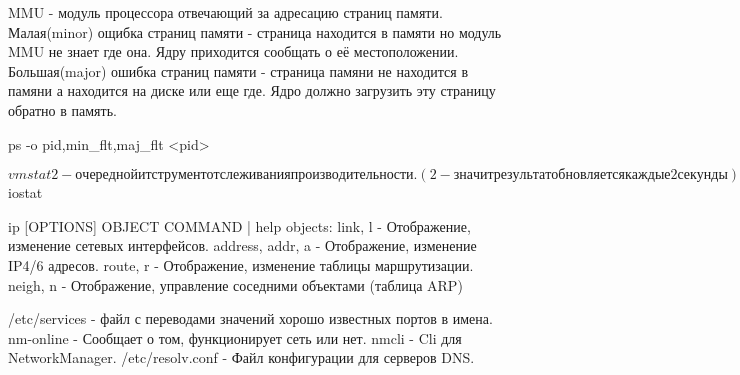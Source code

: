 MMU - модуль процессора отвечающий за адресацию страниц памяти.
    Малая(minor) ощибка страниц памяти - страница находится в памяти но модуль 
MMU не знает где она. Ядру приходится сообщать о её местоположении.
    Большая(major) ошибка страниц памяти - страница памяни не находится в памяни 
а находится на диске или еще где. Ядро должно загрузить эту страницу обратно в
память.

ps -o pid,min_flt,maj_flt <pid> 

$ vmstat 2 - очередной итструмент отслеживания производительности. (2 - значит
результат обновляется каждые 2 секунды).
Поля: %
proc:
 r - run
 b - blocked (запуск не разрешён)
memory:
 swpd - перемещено Kb на диск.
 free - свободно Kb памяти.
 buff - объём памяти для дисковых буферов.
swap:
 si - swap in.(не обязательно свап, может еще читать dll)
 so - swap out.
io:
 bi - blocks in
 bo - blocks out
system:
 in -
 cs -
cpu:
 us - %
 sy - %
 id - %
 wa - %

$ iostat


ip [OPTIONS] OBJECT {COMMAND | help}
objects:
    link, l - Отображение, изменение сетевых интерфейсов.
    address, addr, a - Отображение, изменение IP4/6 адресов.
    route, r - Отображение, изменение таблицы маршрутизации.
    neigh, n - Отображение, управление соседними объектами (таблица ARP)

/etc/services - файл с переводами значений хорошо известных портов в имена.
nm-online - Сообщает о том, функционирует сеть или нет.
nmcli - Cli для NetworkManager.
/etc/resolv.conf - Файл конфигурации для серверов DNS.

